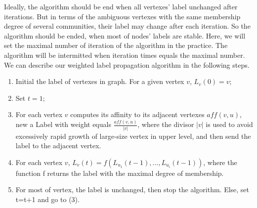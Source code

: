 \documentclass{acm_proc_article-sp}
\begin{document}
Ideally, the algorithm should be end when all vertexes' label unchanged after iterations. But in terms of the ambiguous vertexes with the same membership degree of several communities, their label may change after each iteration. So the algorithm should be ended, when most of nodes' labels are stable. Here, we will set the maximal number of iteration of the algorithm in the practice. The algorithm will be intermitted when iteration times equals the maximal number. We can describe our weighted label propagation algorithm in the following steps.
    \begin{enumerate}
\renewcommand{\labelenumi}{(\theenumi)}
\item Initial the label of vertexes in graph. For a given vertex $v$, $L_v (0)=v$;
\item Set $t=1$;
\item For each vertex $v$ computes its affinity to its adjacent vertexes $aff (v,u)$, new a Label with weight equals $ \frac{aff (v,u)}{|v|}$, where the divisor $|v|$ is used to avoid excessively rapid growth of large-size vertex in upper level, and then send the label to the adjacent vertex.
\item For each vertex $v$, $L_{v}(t)=f(L_{u_{1}}(t-1),...,L_{u_{i}}(t-1))$, where the function f returns the label with the maximal degree of membership.
\item For most of vertex, the label is unchanged, then stop the algorithm. Else, set t=t+1 and go to (3).
\end{enumerate}
\end{document}
